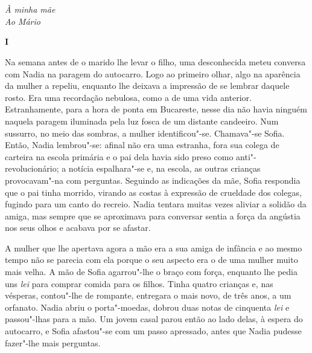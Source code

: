 \chapter*{}
\thispagestyle{empty}

\begin{flushright}
\vfill
\emph{À minha mãe\\Ao Mário}
\end{flushright}

\pagebreak
\thispagestyle{empty}
\movetooddpage

\pagebreak
\vspace*{1.8cm}
\noindent{}\textbf{I}

\bigskip

Na semana antes de o marido lhe levar o filho, uma desconhecida meteu
conversa com Nadia na paragem do autocarro. Logo ao primeiro olhar, algo
na aparência da mulher a repeliu, enquanto lhe deixava a impressão de se
lembrar daquele rosto. Era uma recordação nebulosa, como a de uma vida
anterior. Estranhamente, para a hora de ponta em Bucareste, nesse dia
não havia ninguém naquela paragem iluminada pela luz fosca de um
distante candeeiro. Num sussurro, no meio das sombras, a mulher
identificou"-se. Chamava"-se Sofia. Então, Nadia lembrou"-se: afinal não era uma estranha, fora sua colega de carteira na
escola primária e o pai dela havia sido preso como anti"-revolucionário;
a notícia espalhara"-se e, na escola, as outras crianças provocavam"-na
com perguntas. Seguindo as indicações da mãe, Sofia respondia que o pai
tinha morrido, virando as costas à expressão de crueldade dos colegas,
fugindo para um canto do recreio. Nadia tentara muitas vezes aliviar a
solidão da amiga, mas sempre que se aproximava para conversar sentia a
força da angústia nos seus olhos e acabava por se afastar.

A mulher que lhe apertava agora a mão era a sua amiga de infância e ao
mesmo tempo não se parecia com ela porque o seu aspecto era o de uma
mulher muito mais velha. A mão de Sofia agarrou"-lhe o braço com força,
enquanto lhe pedia uns \emph{lei} para comprar comida para os filhos.
Tinha quatro crianças e, nas vésperas, contou"-lhe de rompante, entregara
o mais novo, de três anos, a um orfanato. Nadia abriu o porta"-moedas,
dobrou duas notas de cinquenta \emph{lei} e passou"-lhas para a mão. Um
jovem casal parou então ao lado delas, à espera do autocarro, e Sofia
afastou"-se com um passo apressado, antes que Nadia pudesse fazer"-lhe
mais perguntas.

